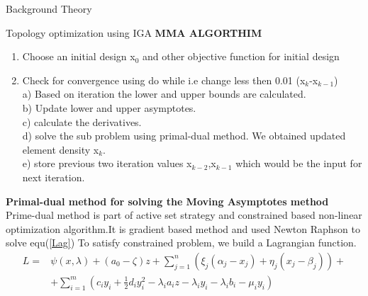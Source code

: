 \documentclass[a4paper,12pt,times]{article}
\begin{document}
\begin{section}{Background Theory}
\begin{subsection}{Topology optimization using IGA}
\textbf{MMA ALGORTHIM}\\
\begin{enumerate}
\item Choose an initial design x$_0$ and other objective function for initial design
\item Check for convergence using do while i.e change less then 0.01 (x$_k$-x$_{k-1}$)\\
 a) Based on iteration the lower and upper bounds are calculated.\\
 b) Update lower and upper asymptotes.\\
 c) calculate the derivatives.\\
 d) solve the sub problem using primal-dual method. We obtained updated element density x$_k$.\\
 e) store previous two iteration values x$_{k-2}$,x$_{k-1}$ which would be the input for next iteration.
 

\end{enumerate}
\textbf{ Primal-dual method for solving the Moving Asymptotes method}\\

Prime-dual method is part of active set strategy and constrained based non-linear optimization algorithm.It is gradient based method and used Newton Raphson to solve equ(\ref{Lag})
To satisfy constrained problem, we build a Lagrangian function.
\begin{equation}\label{Lag}
\begin{aligned}
L=& \psi(x, \lambda)+\left(a_{0}-\zeta\right) z+\sum_{j=1}^{n}\left(\xi_{j}\left(\alpha_{j}-x_{j}\right)+\eta_{j}\left(x_{j}-\beta_{j}\right)\right)+\\
&+\sum_{i=1}^{m}\left(c_{i} y_{i}+\frac{1}{2} d_{i} y_{i}^{2}-\lambda_{i} a_{i} z-\lambda_{i} y_{i}-\lambda_{i} b_{i}-\mu_{i} y_{i}\right)
\end{aligned}
\end{equation}\\


\begin{lstlisting}


\end{lstlisting}
\end{subsection}
\end{section}
\end{document}
